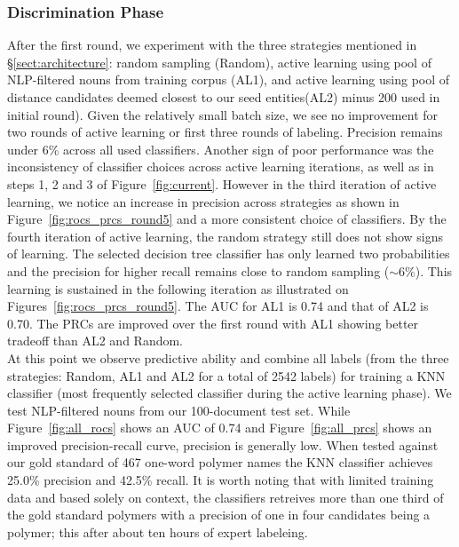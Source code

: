 \subsubsection{Discrimination Phase}
After the first round, we experiment with the three strategies mentioned in \S\ref{sect:architecture}: random sampling (Random), active learning using pool of NLP-filtered nouns from training corpus (AL1), and active learning using pool of  distance candidates deemed closest to our seed entities(AL2) \textemdash minus 200 used in initial round).
Given the relatively small batch size, we see no improvement for two rounds of active learning or first three rounds of labeling. 
Precision remains under 6\% across all used classifiers. 
Another sign of poor performance was the inconsistency of classifier choices across active learning iterations, 
as well as in steps 1, 2 and 3 of Figure~\ref{fig:current}.
However in the third iteration of active learning, we notice an increase in precision across strategies as shown in Figure~\ref{fig:rocs_prcs_round5} and a more consistent choice of classifiers.
By the fourth iteration of active learning, the random strategy still does not show signs of learning. 
The selected decision tree classifier has only learned two probabilities and the precision for higher recall remains close to random sampling ($\sim 6\%$).
This learning is sustained in the following iteration as illustrated on Figures~\ref{fig:rocs_prcs_round5}. 
The AUC for AL1 is 0.74 and that of AL2 is 0.70. The PRCs are improved over the first round with AL1 showing better tradeoff than AL2 and Random.\\


At this point we observe predictive ability and combine all labels (from the three strategies: Random, AL1 and AL2 for a total of 2542 labels) for training a KNN classifier (most frequently selected classifier during the active learning phase).
We test NLP-filtered nouns from our 100-document test set.
While Figure~\ref{fig:all_rocs} shows an AUC of 0.74 and Figure~\ref{fig:all_prcs} shows an improved precision-recall curve, precision is generally low.
When tested against our gold standard of 467 one-word polymer names the KNN classifier achieves 25.0\% precision and  42.5\% recall.	
It is worth noting that with limited training data and based solely on context, the classifiers retreives more than one third of the gold standard polymers with a precision of one in four candidates being a polymer; this after about ten hours of expert labeleing.

